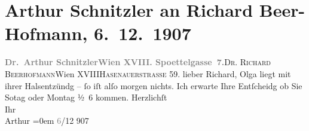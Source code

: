 

         
         \renewcommand{\erwaehntePersonen}{Personen: Richard Beer-Hofmann, Olga Schnitzler}
         \renewcommand{\erwaehnteOrte}{Orte: Edmund-Weiß-Gasse 7, Hasenauerstraße, Wien, XVIII., Währing}
         \renewcommand{\erwaehnteWerke}{}
               \section[Arthur Schnitzler an Richard Beer-Hofmann, 6. 12. 1907]{ Arthur Schnitzler an Richard Beer-Hofmann, 6. 12. 1907}\nopagebreak{}\rehead{ }\begin{ledgroupsized}[t]{13cm}\normalsize\beginnumbering \toendnotes[C]{\smallbreak\pagebreak[2]} 
\pstart{}{\pb}\textcolor{gray}{\textbf{Dr. Arthur Schnitzler}}\pend{}\pstart{}\textcolor{gray}{\textbf{Wien XVIII. Spoettelgasse 7.}}\pend{}{\bigskip}\pstart{}\textsc{Dr. Richard Beerhofmann}\pend{}\pstart{}Wien XVIII\pend{}\pstart{}\textsc{Hasenauerstraße} 59. \pend{}{\bigskip}\pstart{}{\pb}lieber Richard,\pend\pstart
           Olga liegt mit ihrer Halsentzündg – ſo iſt alſo
               morgen nichts. Ich erwarte Ihre Entſcheidg ob Sie So{\geminationn}tag oder Montag{ }½ 6 kommen.\pend
           \pstart
           Herzlichſt{\\[\baselineskip]}Ihr{\\[\baselineskip]}\spacefill\mbox{Arthur}\pend
           \leftskip=0em{}\pstart
           \textcolor{gray}{6}/12 907\pend
           
         
         \endnumbering{}\end{ledgroupsized}  \newcommand{\dateiname}{L01736}\newcommand{\titel}{Arthur Schnitzler an Richard Beer-Hofmann, 6. 12. 1907}\newcommand{\editorInnen}{Martin Anton Müller und Gerd-Hermann Susen}
      